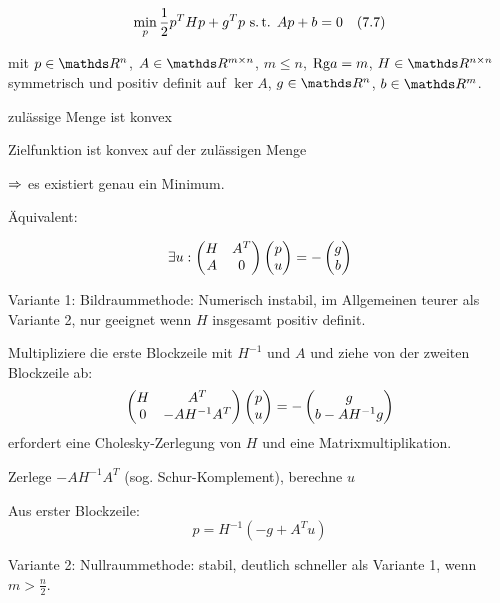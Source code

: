 
\[ \min_p \frac 12 p^T H p + g^T p \text{ s.\,t. } Ap+b= 0 \quad (7.7) \]

mit $p\in\R^n$, $A\in \R^{m\times n}$, $m\leq n$, $\mathrm{Rg} a = m$, $H \in \R^{n\times n}$ symmetrisch und positiv definit auf $\ker A$, $g\in \R^n$, $b\in \R^m$.

\bitm
\item zulässige Menge ist konvex
\item Zielfunktion ist konvex auf der zulässigen Menge
\eitm

$\Rightarrow$ es existiert genau ein Minimum.

Äquivalent:

\[ \exists u: \begin{pmatrix} H & A^T \\ A & 0 \end{pmatrix}    \begin{pmatrix} p \\ u \end{pmatrix}    =    - \begin{pmatrix} g \\ b \end{pmatrix} \]

Variante 1: Bildraummethode: Numerisch instabil, im Allgemeinen teurer als Variante 2, nur geeignet wenn $H$ insgesamt positiv definit.

\bitm
\item Multipliziere die erste Blockzeile mit $H^{-1}$ und $A$ und ziehe von der zweiten Blockzeile ab:
\[ \begin{pmatrix} H & A^T \\ 0 & - A H^{-1} A^T \end{pmatrix}   \begin{pmatrix} p \\ u \end{pmatrix}   =   -\begin{pmatrix} g \\ b - AH^{-1} g \end{pmatrix} \]
erfordert eine Cholesky-Zerlegung von $H$ und eine Matrixmultiplikation.
\item Zerlege $-AH^{-1}A^T$ (sog. Schur-Komplement), berechne $u$
\item Aus erster Blockzeile:
\[ p = H^{-1}( -g + A^T u) \]
\eitm

Variante 2: Nullraummethode: stabil, deutlich schneller als Variante 1, wenn $m > \frac n2$.

